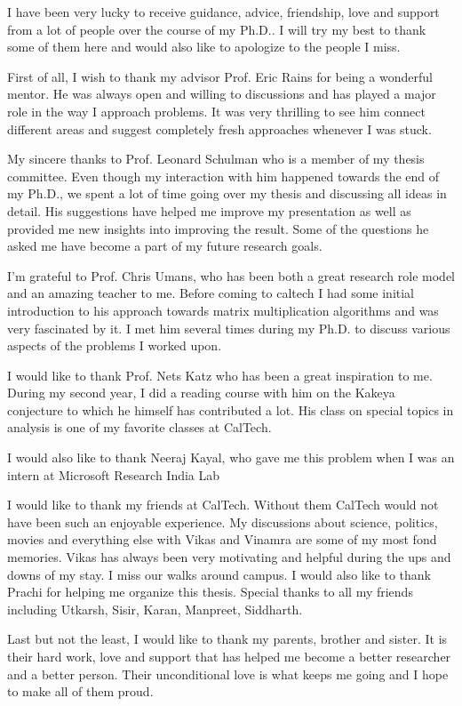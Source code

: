 \documentclass[12pt]{caltech_thesis}
\theoremstyle{plain}
\theoremstyle{definition}
\begin{document}
\begin{acknowledgements} 	 
I have been very lucky to receive guidance, advice, friendship, love and support from a lot of people over the course of my Ph.D..
I will try my best to thank some of them here and would also like to apologize to the people I miss.  

First of all, I wish to thank my advisor Prof. Eric Rains for being a wonderful mentor. He was always open and willing to discussions and
has played a major role in the way I approach problems. It was very thrilling to see him connect different areas and suggest
completely fresh approaches whenever I was stuck. 

My sincere thanks to Prof. Leonard Schulman who is a member of my thesis committee. Even though my interaction with him happened towards
the end of my Ph.D., we spent a lot of time going over my thesis and discussing all ideas in detail. His suggestions have helped me
improve my presentation as well as provided me new insights into improving the result. Some of the questions he asked me have become a part of my future 
research goals. 

I'm grateful to Prof. Chris Umans, who has been both a great research role model and an amazing teacher to me. 
Before coming to caltech I had some initial introduction to his approach towards matrix multiplication 
algorithms and was very fascinated by it.  I met him
several times during my Ph.D. to discuss various aspects of the problems I worked upon. 

I would like to thank Prof. Nets Katz who has been a great inspiration to me. During my second year, I did a reading course
with him on the Kakeya conjecture to which he himself has contributed a lot. His class on special topics in analysis is one of 
my favorite classes at CalTech. 

I would also like to thank Neeraj Kayal, who gave me this problem when I was an intern at Microsoft Research India Lab

I would like to thank my friends at CalTech. Without them CalTech would not have been such an enjoyable experience. My discussions
about science, politics, movies and everything else with Vikas and Vinamra are some of my most fond memories. Vikas has always been 
very motivating and helpful during the ups and downs of my stay. I miss our walks around campus. I would also like to
thank Prachi for helping me organize this thesis. Special thanks to all my friends including 
Utkarsh, Sisir, Karan, Manpreet, Siddharth.

Last but not the least, I would like to thank my parents, brother and sister. It is their hard work, love and support that has helped me 
become a better researcher and a better person. Their unconditional love is what keeps me going and I hope to make all of them proud.





\end{acknowledgements}
\end{document}
